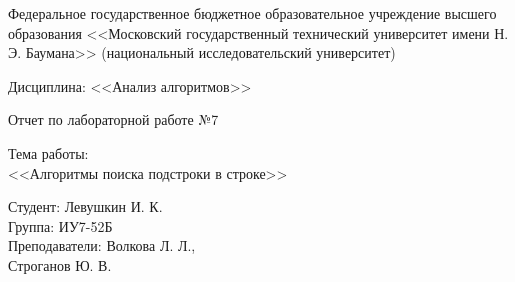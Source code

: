 \documentclass[a4paper,12pt]{article}
\begin{document}


\large
\begin{center}
	Федеральное государственное бюджетное образовательное учреждение 
	высшего образования <<Московский государственный технический 
	университет имени Н. Э. Баумана>> 
	(национальный исследовательский университет)
\end{center}

\vspace*{30mm} 

\huge
\begin{center}
	Дисциплина: <<Анализ алгоритмов>>
	
	Отчет по лабораторной работе №7
\end{center}

\vspace*{30mm} 

\huge
\begin{center}
	Тема работы:\\
	<<Алгоритмы поиска подстроки в строке>>
\end{center}
\vspace*{30mm} 

\large
\begin{flushright}
	Студент: Левушкин И. К. \\
	Группа: ИУ7-52Б \\
	Преподаватели: Волкова Л. Л., \\ Строганов Ю. В. \\
\end{flushright}
\end{document}

